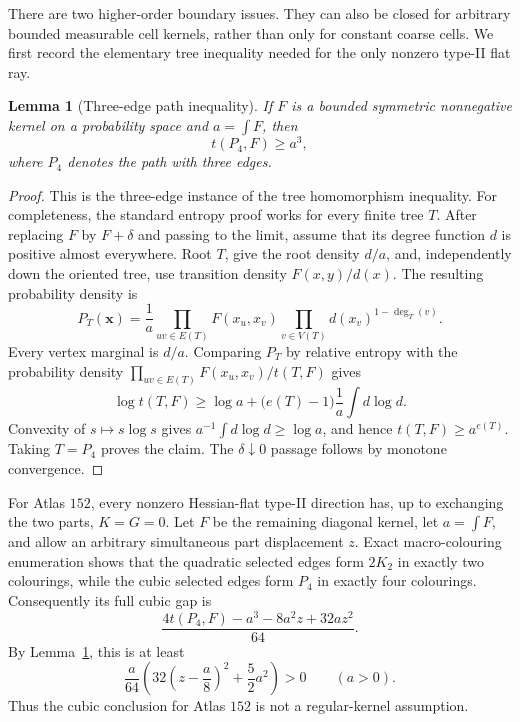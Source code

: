 \documentclass[11pt]{article}
\newtheorem{lemma}[theorem]{Lemma}
\begin{document}
There are two higher-order boundary issues.  They can also be closed for
arbitrary bounded measurable cell kernels, rather than only for constant
coarse cells.  We first record the elementary tree inequality needed for
the only nonzero type-II flat ray.

\begin{lemma}[Three-edge path inequality]\label{lem:path-three}
If $F$ is a bounded symmetric nonnegative kernel on a probability space and
$a=\int F$, then
\[
 t(P_4,F)\geq a^3,
\]
where $P_4$ denotes the path with three edges.
\end{lemma}

\begin{proof}
This is the three-edge instance of the tree homomorphism inequality.  For
completeness, the standard entropy proof works for every finite tree $T$.
After replacing $F$ by $F+\delta$ and passing to the limit, assume that its
degree function $d$ is positive almost everywhere.  Root $T$, give the root
density $d/a$, and, independently down the oriented tree, use transition
density $F(x,y)/d(x)$.  The resulting probability density is
\[
 P_T(\boldsymbol{x})
 =\frac1a\prod_{uv\in E(T)}F(x_u,x_v)
   \prod_{v\in V(T)}d(x_v)^{1-\deg_T(v)}.
\]
Every vertex marginal is $d/a$.  Comparing $P_T$ by relative entropy with
the probability density
$\prod_{uv\in E(T)}F(x_u,x_v)/t(T,F)$ gives
\[
 \log t(T,F)
 \geq \log a+\bigl(e(T)-1\bigr)
       \frac1a\int d\log d.
\]
Convexity of $s\mapsto s\log s$ gives
$a^{-1}\int d\log d\geq\log a$, and hence
$t(T,F)\geq a^{e(T)}$.  Taking $T=P_4$ proves the claim.  The
$\delta\downarrow0$ passage follows by monotone convergence.
\end{proof}

For Atlas $152$, every nonzero Hessian-flat type-II direction has, up to
exchanging the two parts, $K=G=0$.  Let $F$ be the remaining diagonal
kernel, let $a=\int F$, and allow an arbitrary simultaneous part displacement
$z$.  Exact macro-colouring enumeration shows that the quadratic selected
edges form $2K_2$ in exactly two colourings, while the cubic selected edges
form $P_4$ in exactly four colourings.  Consequently its full cubic gap is
\[
 \frac{4t(P_4,F)-a^3-8a^2z+32az^2}{64}.
\]
By Lemma~\ref{lem:path-three}, this is at least
\[
 \frac{a}{64}
 \left(32\left(z-\frac a8\right)^2+\frac52a^2\right)>0
 \qquad(a>0).
\]
Thus the cubic conclusion for Atlas $152$ is not a regular-kernel
assumption.
\end{document}
